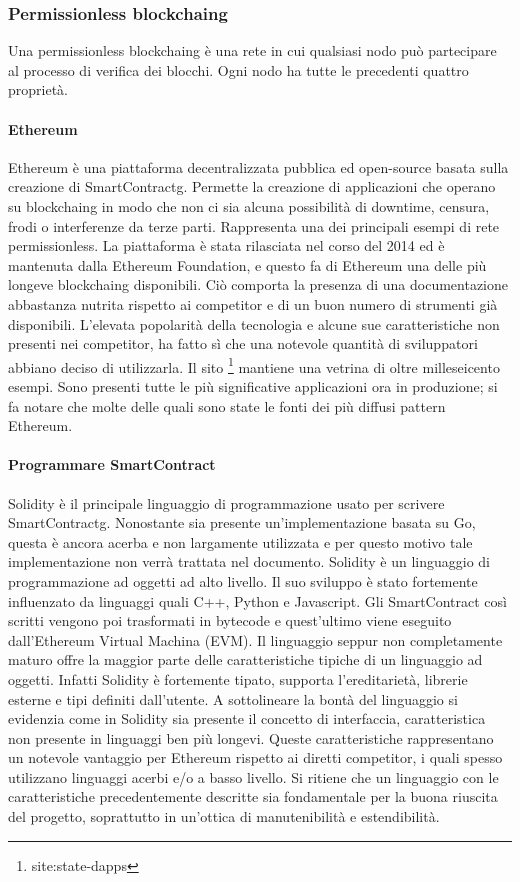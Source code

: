 \subsubsection{Permissionless blockchaing}
Una permissionless \gls{blockchaing} è una rete in cui qualsiasi nodo può partecipare al processo di verifica dei blocchi. Ogni nodo ha tutte le precedenti quattro proprietà.

\paragraph{Ethereum}
Ethereum è una piattaforma decentralizzata pubblica ed open-source basata sulla creazione di \gls{SmartContractg}. Permette la creazione di applicazioni che operano su \gls{blockchaing} in modo che non ci sia alcuna possibilità di downtime, censura, frodi o interferenze da terze parti. Rappresenta una dei principali esempi di rete permissionless.
La piattaforma è stata rilasciata nel corso del 2014 ed è mantenuta dalla Ethereum Foundation, e questo fa di Ethereum una delle più longeve \gls{blockchaing} disponibili. Ciò comporta la presenza di una documentazione abbastanza nutrita rispetto ai competitor e di un buon numero di strumenti già disponibili. 
L’elevata popolarità della tecnologia e alcune sue caratteristiche non presenti nei competitor, ha fatto sì che una notevole quantità di sviluppatori abbiano deciso di utilizzarla. Il sito \footnote{site:state-dapps} mantiene una vetrina di oltre milleseicento esempi. Sono presenti tutte le più significative applicazioni ora in produzione; si fa notare che molte delle quali sono state le fonti dei più diffusi pattern Ethereum.

\paragraph{Programmare SmartContract}
Solidity è il principale linguaggio di programmazione usato per scrivere \gls{SmartContractg}. Nonostante sia presente un’implementazione basata su Go, questa è ancora acerba e non largamente utilizzata e per questo motivo tale implementazione non verrà trattata nel documento.
Solidity è un linguaggio di programmazione ad oggetti ad alto livello. Il suo sviluppo è stato fortemente influenzato da linguaggi quali C++, Python e Javascript. Gli SmartContract così scritti vengono poi trasformati in bytecode e quest’ultimo viene eseguito dall’Ethereum Virtual Machina (EVM).
Il linguaggio seppur non completamente maturo offre la maggior parte delle caratteristiche tipiche di un linguaggio ad oggetti. Infatti Solidity è fortemente tipato, supporta l’ereditarietà, librerie esterne e tipi definiti dall’utente. A sottolineare la bontà del linguaggio si evidenzia come in Solidity sia presente il concetto di interfaccia, caratteristica non presente in linguaggi ben più longevi. 
Queste caratteristiche rappresentano un notevole vantaggio per Ethereum rispetto ai diretti competitor, i quali spesso utilizzano linguaggi acerbi e/o a basso livello. Si ritiene che un linguaggio con le caratteristiche precedentemente descritte sia fondamentale per la buona riuscita del progetto, soprattutto in un’ottica di manutenibilità e estendibilità.
